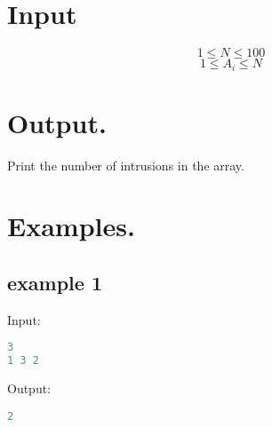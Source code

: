 \documentclass[10pt]{article}
\begin{document}
\section{Input}
$$ 1\le N \le 100 $$
$$ 1\le A_i \le N $$
\section{Output.}
Print the number of intrusions in the array.
\section{Examples.}
\subsection{example 1}
Input:
\begin{lstlisting}[language=Python]
3
1 3 2
\end{lstlisting}
Output:
\begin{lstlisting}[language=Python]
2
\end{lstlisting}
\newpage
\end{document}
